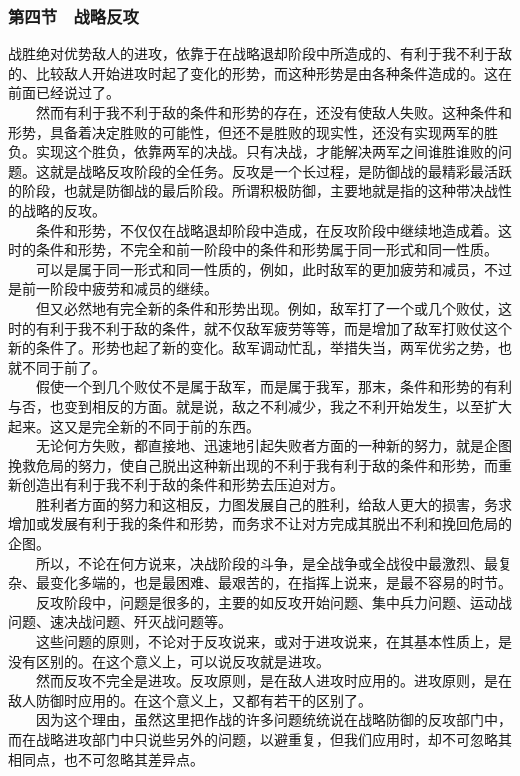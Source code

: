 \documentclass[cn,11pt,chinese]{elegantbook}
\def\myformat#1{\hfil\hfil #1}
\begin{document}
\subsubsection*{\myformat{第四节　战略反攻}}
战胜绝对优势敌人的进攻，依靠于在战略退却阶段中所造成的、有利于我不利于敌的、比较敌人开始进攻时起了变化的形势，而这种形势是由各种条件造成的。这在前面已经说过了。\\
　　然而有利于我不利于敌的条件和形势的存在，还没有使敌人失败。这种条件和形势，具备着决定胜败的可能性，但还不是胜败的现实性，还没有实现两军的胜负。实现这个胜负，依靠两军的决战。只有决战，才能解决两军之间谁胜谁败的问题。这就是战略反攻阶段的全任务。反攻是一个长过程，是防御战的最精彩最活跃的阶段，也就是防御战的最后阶段。所谓积极防御，主要地就是指的这种带决战性的战略的反攻。\\
　　条件和形势，不仅仅在战略退却阶段中造成，在反攻阶段中继续地造成着。这时的条件和形势，不完全和前一阶段中的条件和形势属于同一形式和同一性质。\\
　　可以是属于同一形式和同一性质的，例如，此时敌军的更加疲劳和减员，不过是前一阶段中疲劳和减员的继续。\\
　　但又必然地有完全新的条件和形势出现。例如，敌军打了一个或几个败仗，这时的有利于我不利于敌的条件，就不仅敌军疲劳等等，而是增加了敌军打败仗这个新的条件了。形势也起了新的变化。敌军调动忙乱，举措失当，两军优劣之势，也就不同于前了。\\
　　假使一个到几个败仗不是属于敌军，而是属于我军，那末，条件和形势的有利与否，也变到相反的方面。就是说，敌之不利减少，我之不利开始发生，以至扩大起来。这又是完全新的不同于前的东西。\\
　　无论何方失败，都直接地、迅速地引起失败者方面的一种新的努力，就是企图挽救危局的努力，使自己脱出这种新出现的不利于我有利于敌的条件和形势，而重新创造出有利于我不利于敌的条件和形势去压迫对方。\\
　　胜利者方面的努力和这相反，力图发展自己的胜利，给敌人更大的损害，务求增加或发展有利于我的条件和形势，而务求不让对方完成其脱出不利和挽回危局的企图。\\
　　所以，不论在何方说来，决战阶段的斗争，是全战争或全战役中最激烈、最复杂、最变化多端的，也是最困难、最艰苦的，在指挥上说来，是最不容易的时节。\\
　　反攻阶段中，问题是很多的，主要的如反攻开始问题、集中兵力问题、运动战问题、速决战问题、歼灭战问题等。\\
　　这些问题的原则，不论对于反攻说来，或对于进攻说来，在其基本性质上，是没有区别的。在这个意义上，可以说反攻就是进攻。\\
　　然而反攻不完全是进攻。反攻原则，是在敌人进攻时应用的。进攻原则，是在敌人防御时应用的。在这个意义上，又都有若干的区别了。\\
　　因为这个理由，虽然这里把作战的许多问题统统说在战略防御的反攻部门中，而在战略进攻部门中只说些另外的问题，以避重复，但我们应用时，却不可忽略其相同点，也不可忽略其差异点。\\
\end{document}
